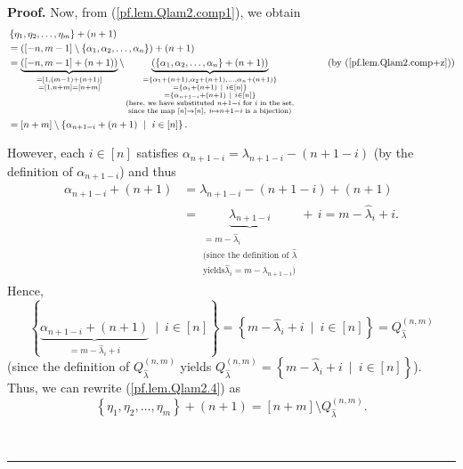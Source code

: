 \documentclass[numbers=enddot,12pt,final,onecolumn,notitlepage]{scrartcl}%
\theoremstyle{definition}
\newenvironment{proof}[1][Proof]{\noindent\textbf{#1.} }{\ \rule{0.5em}{0.5em}}
\begin{document}
\begin{enumerate}
\begin{proof}
Now, from (\ref{pf.lem.Qlam2.comp1}), we obtain%
\begin{align}
&  \left\{  \eta_{1},\eta_{2},\ldots,\eta_{m}\right\}  +\left(  n+1\right)
\nonumber\\
&  =\left(  \left[  -n,m-1\right]  \setminus\left\{  \alpha_{1},\alpha
_{2},\ldots,\alpha_{n}\right\}  \right)  +\left(  n+1\right) \nonumber\\
&  =\underbrace{\left(  \left[  -n,m-1\right]  +\left(  n+1\right)  \right)
}_{\substack{=\left[  1,\left(  m-1\right)  +\left(  n+1\right)  \right]
\\=\left[  1,n+m\right]  =\left[  n+m\right]  }}\setminus\underbrace{\left(
\left\{  \alpha_{1},\alpha_{2},\ldots,\alpha_{n}\right\}  +\left(  n+1\right)
\right)  }_{\substack{=\left\{  \alpha_{1}+\left(  n+1\right)  ,\alpha
_{2}+\left(  n+1\right)  ,\ldots,\alpha_{n}+\left(  n+1\right)  \right\}
\\=\left\{  \alpha_{i}+\left(  n+1\right)  \ \mid\ i\in\left[  n\right]
\right\}  \\=\left\{  \alpha_{n+1-i}+\left(  n+1\right)  \ \mid\ i\in\left[
n\right]  \right\}  \\\text{(here, we have substituted }n+1-i\text{ for
}i\text{ in the set,}\\\text{since the map }\left[  n\right]  \rightarrow
\left[  n\right]  ,\ i\mapsto n+1-i\text{ is a bijection)}}%
}\ \ \ \ \ \ \ \ \ \ \left(  \text{by (\ref{pf.lem.Qlam2.comp+z})}\right)
\nonumber\\
&  =\left[  n+m\right]  \setminus\left\{  \alpha_{n+1-i}+\left(  n+1\right)
\ \mid\ i\in\left[  n\right]  \right\}  . \label{pf.lem.Qlam2.4}%
\end{align}


However, each $i\in\left[  n\right]  $ satisfies $\alpha_{n+1-i}%
=\lambda_{n+1-i}-\left(  n+1-i\right)  $ (by the definition of $\alpha
_{n+1-i}$) and thus%
\begin{align*}
\alpha_{n+1-i}+\left(  n+1\right)   &  =\lambda_{n+1-i}-\left(  n+1-i\right)
+\left(  n+1\right) \\
&  =\underbrace{\lambda_{n+1-i}}_{\substack{=m-\widehat{\lambda}%
_{i}\\\text{(since the definition of }\widehat{\lambda}\\\text{yields
}\widehat{\lambda}_{i}=m-\lambda_{n+1-i}\text{)}}}+\,i=m-\widehat{\lambda}%
_{i}+i.
\end{align*}
Hence,%
\[
\left\{  \underbrace{\alpha_{n+1-i}+\left(  n+1\right)  }_{=m-\widehat{\lambda
}_{i}+i}\ \mid\ i\in\left[  n\right]  \right\}  =\left\{  m-\widehat{\lambda
}_{i}+i\ \mid\ i\in\left[  n\right]  \right\}  =Q_{\widehat{\lambda}}^{\left(
n,m\right)  }%
\]
(since the definition of $Q_{\widehat{\lambda}}^{\left(  n,m\right)  }$ yields
$Q_{\widehat{\lambda}}^{\left(  n,m\right)  }=\left\{  m-\widehat{\lambda}%
_{i}+i\ \mid\ i\in\left[  n\right]  \right\}  $). Thus, we can rewrite
(\ref{pf.lem.Qlam2.4}) as%
\begin{equation}
\left\{  \eta_{1},\eta_{2},\ldots,\eta_{m}\right\}  +\left(  n+1\right)
=\left[  n+m\right]  \setminus Q_{\widehat{\lambda}}^{\left(  n,m\right)  }.
\label{pf.lem.Qlam2.6}%
\end{equation}



\end{proof}
\end{enumerate}
\end{document}
